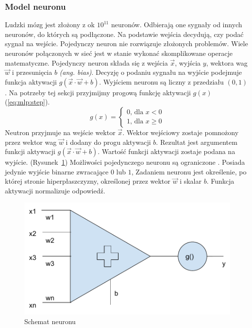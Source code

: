 \documentclass[a4paper,12pt,twoside,openany]{report}
\newcommand{\ang}[1]{\textit{(ang. #1)}}
\newcommand{\Rys}[1]{(Rysunek~\ref{#1})}
\newcommand{\Eq}[1]{(\ref{#1})}
\begin{document}
\subsubsection{Model neuronu}
Ludzki mózg jest złożony z ok $10^{11}$ neuronów.
Odbierają one sygnały od innych neuronów, do których są podłączone.
Na podstawie wejścia decydują, czy podać sygnał na wejście.
Pojedynczy neuron nie rozwiązuje złożonych problemów.
Wiele neuronów połączonych w sieć jest w stanie wykonać skomplikowane operacje matematyczne.
Pojedynczy neuron składa się z wejścia $\vec{x}$, wyjścia $y$, wektora wag $\vec{w}$ i przesunięcia $b$ \ang{bias}.
Decyzję o podaniu sygnału na wyjście podejmuje funkcja aktywacji $g(\vec{x} \cdot \vec{w} + b)$.
Wyjściem neuronu są liczny z przedziału $(0, 1)$.
Na potrzeby tej sekcji przyjmijmy progową funkcję aktywacji $g(x)$ \Eq{eq:mlp:step}.
\begin{equation}
	\label{eq:mlp:step}
g(x)={\begin{cases}0{\text{, dla }}x<0\\1{\text{, dla }}x\geq 0\end{cases}}
\end{equation}
Neutron przyjmuje na wejście wektor $\vec{x}$.
Wektor wejściowy zostaje pomnożony przez wektor wag $\vec{w}$ i dodany do progu aktywacji $b$.
Rezultat jest argumentem funkcji aktywacji  $g(\vec{x} \cdot \vec{w} + b)$.
Wartość funkcji aktywacji zostaje podana na wyjście. \Rys{rys:mlp:neuron}
Możliwości pojedynczego neuronu są ograniczone \cite{Jeon2018}.
Posiada jedynie wyjście binarne zwracające $0$ lub $1$, 
Zadaniem neuronu jest określenie, po której stronie hiperpłaszczyzny, 
określonej przez wektor $\vec w$ i skalar $b$.
Funkcja aktywacji normalizuje odpowiedź.
\begin{figure}[h]
	\centering
	\includegraphics[width=\textwidth]{neuron}
	\caption{Schemat neuronu}
	\label{rys:mlp:neuron}
\end{figure}
\end{document}
